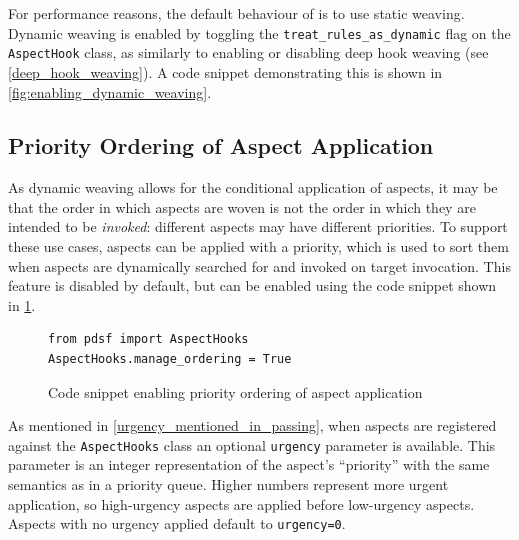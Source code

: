 For performance reasons, the default behaviour of \pdsfthree is to use static
weaving. Dynamic weaving is enabled by toggling the
\lstinline{treat_rules_as_dynamic} flag on the \lstinline{AspectHook} class, as
similarly to enabling or disabling deep hook weaving (see
\cref{deep_hook_weaving}). A code snippet demonstrating this is shown in
\cref{fig:enabling_dynamic_weaving}.


\subsection{Priority Ordering of Aspect Application}
\label{aspect_priority_support}

As dynamic weaving allows for the conditional application of aspects, it may be
that the order in which aspects are woven is not the order in which they are
intended to be \emph{invoked}: different aspects may have different priorities.
To support these use cases, aspects can be applied with a priority, which is
used to sort them when aspects are dynamically searched for and invoked on
target invocation. This feature is disabled by default, but can be enabled using
the code snippet shown in \cref{fig:enabling_priority_sorting_of_aspects}.

\begin{figure}[h]
    \begin{lstlisting}[style=footnotesize_python]
from pdsf import AspectHooks
AspectHooks.manage_ordering = True
    \end{lstlisting}
    \caption{Code snippet enabling priority ordering of aspect application}
    \label{fig:enabling_priority_sorting_of_aspects}
\end{figure}

As mentioned in \cref{urgency_mentioned_in_passing}, when aspects are registered
against the \lstinline{AspectHooks} class an optional \lstinline{urgency}
parameter is available. This parameter is an integer representation of the
aspect's ``priority'' with the same semantics as in a priority queue. Higher
numbers represent more urgent application, so high-urgency aspects are applied
before low-urgency aspects. Aspects with no urgency applied default to
\lstinline{urgency=0}.


